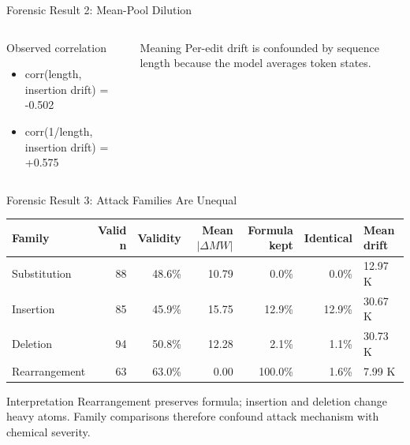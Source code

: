 \documentclass[aspectratio=169,10pt]{beamer}
\begin{document}
\begin{frame}{Forensic Result 2: Mean-Pool Dilution}
\begin{columns}[T,totalwidth=\textwidth]
\begin{block}{Observed correlation}
\begin{itemize}
  \item corr(length, insertion drift) = -0.502
  \item corr(1/length, insertion drift) = +0.575
\end{itemize}
\end{block}
\begin{alertblock}{Meaning}
Per-edit drift is confounded by sequence length because the model averages token states.
\end{alertblock}
\end{columns}
\end{frame}

\begin{frame}{Forensic Result 3: Attack Families Are Unequal}
\scriptsize
\begin{tabularx}{\textwidth}{@{}lrrrrrX@{}}
\toprule
Family & Valid n & Validity & Mean $\lvert\Delta MW\rvert$ & Formula kept & Identical & Mean drift\\
\midrule
Substitution & 88 & 48.6\% & 10.79 & 0.0\% & 0.0\% & 12.97 K\\
Insertion & 85 & 45.9\% & 15.75 & 12.9\% & 12.9\% & 30.67 K\\
Deletion & 94 & 50.8\% & 12.28 & 2.1\% & 1.1\% & 30.73 K\\
Rearrangement & 63 & 63.0\% & 0.00 & 100.0\% & 1.6\% & 7.99 K\\
\bottomrule
\end{tabularx}

\vspace{1em}
\begin{alertblock}{Interpretation}
Rearrangement preserves formula; insertion and deletion change heavy atoms. Family comparisons therefore confound attack mechanism with chemical severity.
\end{alertblock}
\end{frame}
\end{document}
